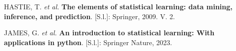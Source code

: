 \documentclass[
  letterpaper,
  DIV=11,
  numbers=noendperiod]{scrreprt}
\newlength{\cslhangindent}
\newenvironment{CSLReferences}[2] %
 {\begin{list}{}{%
  \setlength{\itemindent}{0pt}
  \setlength{\leftmargin}{0pt}
  \setlength{\parsep}{0pt}
  \ifodd #1
   \setlength{\leftmargin}{\cslhangindent}
   \setlength{\itemindent}{-1\cslhangindent}
  \fi
  \setlength{\itemsep}{#2\baselineskip}}}
 {\end{list}}
\begin{document}
\label{refs}
\begin{CSLReferences}{0}{1}
HASTIE, T. \emph{et al.} \textbf{The elements of statistical learning:
data mining, inference, and prediction}. {[}S.l.{]}: Springer, 2009. V.
2.

JAMES, G. \emph{et al.} \textbf{An introduction to statistical learning:
With applications in python}. {[}S.l.{]}: Springer Nature, 2023.

\end{CSLReferences}
\end{document}
